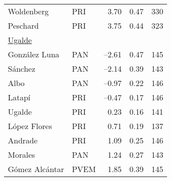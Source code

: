 \documentclass[12 pt, letter]{article}
\begin{document}
\begin{table}
\begin{center}
\begin{tabular}{llrrr}
Woldenberg        & PRI &  3.70  &   0.47 & 330\\
Peschard          & PRI &  3.75  &   0.44 & 323\\ [1ex]
\multicolumn{5}{l}{\underline{Ugalde}}         \\ [1.5ex]
Gonz\'alez Luna   & PAN &--2.61  &   0.47 & 145\\
S\'anchez         & PAN &--2.14  &   0.39 & 143\\
Albo              & PAN &--0.97  &   0.22 & 146\\
Latap\'i          & PRI &--0.47  &   0.17 & 146\\
Ugalde            & PRI &  0.23  &   0.16 & 141\\
L\'opez Flores    & PRI &  0.71  &   0.19 & 137\\
Andrade           & PRI &  1.09  &   0.25 & 146\\
Morales           & PAN &  1.24  &   0.27 & 143\\
G\'omez Alc\'antar& PVEM&  1.85  &   0.39 & 145\\ \hline
\end{tabular}
\end{center}
\end{table}
\end{document}
